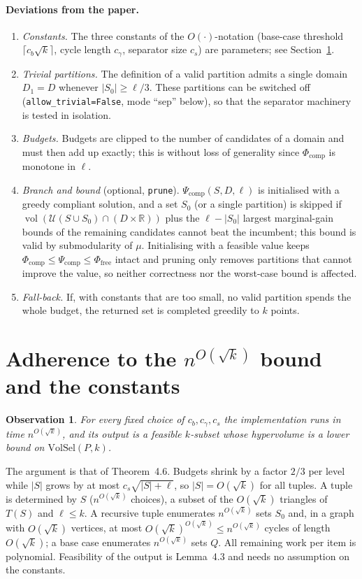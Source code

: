 \documentclass[12pt,a4paper]{article}
\newcommand{\vol}{\operatorname{vol}}
\newcommand{\U}{\mathcal{U}}
\newcommand{\R}{\mathbb{R}}
\newcommand{\Pfree}{\Phi_{\mathrm{free}}}
\newcommand{\Pcomp}{\Phi_{\mathrm{comp}}}
\newcommand{\Psic}{\Psi_{\mathrm{comp}}}
\newcommand{\code}[1]{\texttt{#1}}
\newtheorem{observation}{Observation}
\begin{document}
\paragraph{Deviations from the paper.}
\begin{enumerate}\setlength{\itemsep}{0.2ex}
\item \emph{Constants.}  The three constants of the $O(\cdot)$-notation (base-case threshold
  $\lceil c_b\sqrt{k}\rceil$, cycle length $c_\gamma$, separator size $c_s$) are parameters; see
  Section~\ref{sec:const}.
\item \emph{Trivial partitions.}  The definition of a valid partition admits a single domain
  $D_1=D$ whenever $|S_0|\ge\ell/3$.  These partitions can be switched off
  (\code{allow\_trivial=False}, mode ``sep'' below), so that the separator machinery is tested in isolation.
\item \emph{Budgets.}  Budgets are clipped to the number of candidates of a domain and must then
  add up exactly; this is without loss of generality since $\Pcomp$ is monotone in $\ell$.
\item \emph{Branch and bound} (optional, \code{prune}).  $\Psic(S,D,\ell)$ is initialised with a
  greedy compliant solution, and a set $S_0$ (or a single partition) is skipped if
  $\vol(\U(S\cup S_0)\cap(D\times\R))$ plus the $\ell-|S_0|$ largest marginal-gain bounds of the
  remaining candidates cannot beat the incumbent; this bound is valid by submodularity of $\mu$.
  Initialising with a feasible value keeps $\Pcomp\le\Psic\le\Pfree$ intact and pruning only removes
  partitions that cannot improve the value, so neither correctness nor the worst-case bound is affected.
\item \emph{Fall-back.}  If, with constants that are too small, no valid partition spends the whole
  budget, the returned set is completed greedily to $k$ points.
\end{enumerate}

\section{Adherence to the $n^{O(\sqrt{k})}$ bound and the constants}
\label{sec:const}
\begin{observation}
For every fixed choice of $c_b,c_\gamma,c_s$ the implementation runs in time $n^{O(\sqrt{k})}$, and
its output is a feasible $k$-subset whose hypervolume is a lower bound on $\mathrm{VolSel}(P,k)$.
\end{observation}
\noindent
The argument is that of Theorem~4.6.  Budgets shrink by a factor $2/3$ per level while $|S|$ grows by at
most $c_s\sqrt{|S|+\ell}$, so $|S|=O(\sqrt{k})$ for all tuples.  A tuple is determined by $S$
($n^{O(\sqrt{k})}$ choices), a subset of the $O(\sqrt{k})$ triangles of $T(S)$ and $\ell\le k$.  A
recursive tuple enumerates $n^{O(\sqrt{k})}$ sets $S_0$ and, in a graph with $O(\sqrt{k})$ vertices, at
most $O(\sqrt{k})^{O(\sqrt{k})}\le n^{O(\sqrt{k})}$ cycles of length $O(\sqrt{k})$; a base case
enumerates $n^{O(\sqrt{k})}$ sets $Q$.  All remaining work per item is polynomial.
Feasibility of the output is Lemma~4.3 and needs no assumption on the constants.
\end{document}
